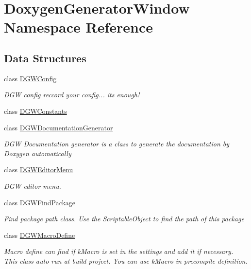 \hypertarget{namespaceDoxygenGeneratorWindow}{}\section{Doxygen\+Generator\+Window Namespace Reference}
\label{namespaceDoxygenGeneratorWindow}
\subsection*{Data Structures}
\begin{DoxyCompactItemize}
\item 
class \hyperlink{classDoxygenGeneratorWindow_1_1DGWConfig}{D\+G\+W\+Config}
\begin{DoxyCompactList}\small\item\em D\+GW config reccord your config... it\textquotesingle{}s enough! \end{DoxyCompactList}\item 
class \hyperlink{classDoxygenGeneratorWindow_1_1DGWConstants}{D\+G\+W\+Constants}
\item 
class \hyperlink{classDoxygenGeneratorWindow_1_1DGWDocumentationGenerator}{D\+G\+W\+Documentation\+Generator}
\begin{DoxyCompactList}\small\item\em D\+GW Documentation generator is a class to generate the documentation by Doxygen automatically \end{DoxyCompactList}\item 
class \hyperlink{classDoxygenGeneratorWindow_1_1DGWEditorMenu}{D\+G\+W\+Editor\+Menu}
\begin{DoxyCompactList}\small\item\em D\+GW editor menu. \end{DoxyCompactList}\item 
class \hyperlink{classDoxygenGeneratorWindow_1_1DGWFindPackage}{D\+G\+W\+Find\+Package}
\begin{DoxyCompactList}\small\item\em Find package path class. Use the Scriptable\+Object to find the path of this package \end{DoxyCompactList}\item 
class \hyperlink{classDoxygenGeneratorWindow_1_1DGWMacroDefine}{D\+G\+W\+Macro\+Define}
\begin{DoxyCompactList}\small\item\em Macro define can find if k\+Macro is set in the settings and add it if necessary. This class auto run at build project. You can use k\+Macro in precompile definition. \end{DoxyCompactList}\end{DoxyCompactItemize}
